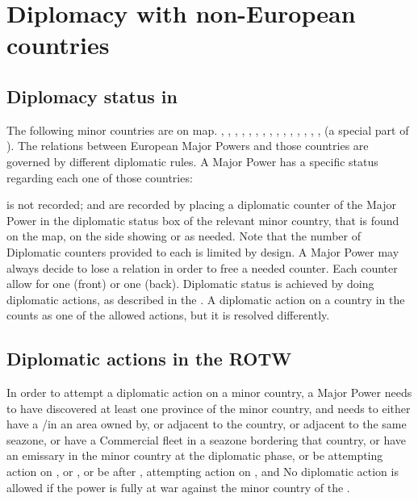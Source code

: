 \section{Diplomacy with non-European countries}

\subsection{Diplomacy status in \ROTW} 
\aparag The following minor countries are on \ROTW map.  \paysInca,
\paysAzteque, \paysGujarat, \paysVijayanagar, \paysMogol, \paysChine,
\paysJapon, \paysSiberie, \paysOman, \paysAden, \paysSoudan,
\paysMysore, \paysHyderabad, \paysIroquois, \paysAfghans, \paysOrmus (a
special part of \paysPerse).  The relations between European Major
Powers and those countries are governed by different diplomatic rules.
\aparag[Generalities]
A Major Power has a specific status regarding  each one of those countries:
\begin{deflist}
\end{deflist}
\bparag \dipNR is not recorded; 
\bparag \dipFR and \dipAT are recorded by placing a \ROTW diplomatic
counter of the Major Power in the diplomatic status box of the relevant
minor country, that is found on the \ROTW map, on the side showing
\dipFR or \dipAT as needed.
\bparag Note that the number of \ROTW Diplomatic counters provided to
each \MAJ is limited by design. A Major Power may always decide to lose
a relation in order to free a needed counter. Each counter allow for one
\dipFR (front) or one \dipAT (back).%
\aparag Diplomatic status is achieved by doing diplomatic actions, as
described in the . A diplomatic action
on a country in the \ROTW counts as one of the allowed actions, but it
is resolved differently.



\subsection{Diplomatic actions in the ROTW}
In order to attempt a diplomatic action on a \ROTW minor country,
a Major Power needs to have discovered at least one province of the
minor country, and needs to
\bparag either have a \TP/\COL in an area owned by, or adjacent to the
country, or adjacent to the same seazone,
\bparag or have a Commercial fleet in a seazone bordering that country,
\bparag or have an emissary in the minor country at the diplomatic
phase,
\bparag or be \TUR attempting action on ,  or
,
\bparag or be \VEN after , attempting
action on ,  and 
\bparag No diplomatic action is allowed if the power is fully at war
against the minor country of the \ROTW.

